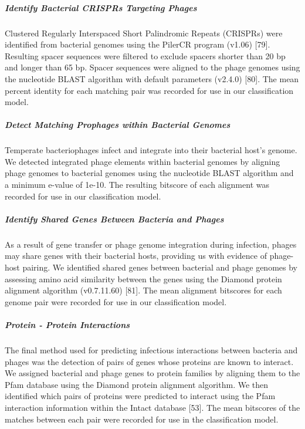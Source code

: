 \documentclass[12pt,]{article}
\let\oldsubparagraph\subparagraph
\renewcommand{\subparagraph}[1]{\oldsubparagraph{#1}\mbox{}}
\begin{document}
\subparagraph{Identify Bacterial CRISPRs Targeting
Phages}\label{identify-bacterial-crisprs-targeting-phages}

Clustered Regularly Interspaced Short Palindromic Repeats (CRISPRs) were
identified from bacterial genomes using the PilerCR program (v1.06)
{[}79{]}. Resulting spacer sequences were filtered to exclude spacers
shorter than 20 bp and longer than 65 bp. Spacer sequences were aligned
to the phage genomes using the nucleotide BLAST algorithm with default
parameters (v2.4.0) {[}80{]}. The mean percent identity for each
matching pair was recorded for use in our classification model.

\subparagraph{Detect Matching Prophages within Bacterial
Genomes}\label{detect-matching-prophages-within-bacterial-genomes}

Temperate bacteriophages infect and integrate into their bacterial
host's genome. We detected integrated phage elements within bacterial
genomes by aligning phage genomes to bacterial genomes using the
nucleotide BLAST algorithm and a minimum e-value of 1e-10. The resulting
bitscore of each alignment was recorded for use in our classification
model.

\subparagraph{Identify Shared Genes Between Bacteria and
Phages}\label{identify-shared-genes-between-bacteria-and-phages}

As a result of gene transfer or phage genome integration during
infection, phages may share genes with their bacterial hosts, providing
us with evidence of phage-host pairing. We identified shared genes
between bacterial and phage genomes by assessing amino acid similarity
between the genes using the Diamond protein alignment algorithm
(v0.7.11.60) {[}81{]}. The mean alignment bitscores for each genome pair
were recorded for use in our classification model.

\subparagraph{Protein - Protein
Interactions}\label{protein---protein-interactions}

The final method used for predicting infectious interactions between
bacteria and phages was the detection of pairs of genes whose proteins
are known to interact. We assigned bacterial and phage genes to protein
families by aligning them to the Pfam database using the Diamond protein
alignment algorithm. We then identified which pairs of proteins were
predicted to interact using the Pfam interaction information within the
Intact database {[}53{]}. The mean bitscores of the matches between each
pair were recorded for use in the classification model.
\end{document}
